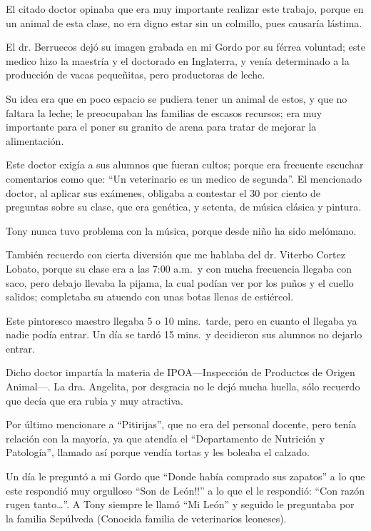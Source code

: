 \documentclass[letterpaper, 12pt]{book}
\begin{document}
El  citado doctor opinaba que era muy importante realizar este trabajo, porque en un animal de esta clase, no era digno estar sin un colmillo, pues causaría lástima.

El dr. Berruecos dejó su imagen grabada en mi Gordo por su férrea voluntad; este medico hizo la maestría y el doctorado en Inglaterra, y venía determinado a la producción de vacas pequeñitas, pero productoras de leche. 

Su idea era que en poco espacio se pudiera tener un animal de estos, y que no faltara la leche; le preocupaban las familias de escasos recursos; era muy importante para el poner su granito de arena para tratar de mejorar la alimentación.

Este doctor exigía a sus alumnos que fueran cultos; porque era frecuente escuchar comentarios como que: ``Un veterinario es un medico de segunda''.
El mencionado doctor, al aplicar sus exámenes, obligaba a contestar el 30 por ciento de preguntas sobre su clase, que era genética, y setenta, de música clásica y pintura.

Tony nunca tuvo problema con la música, porque desde niño ha sido melómano. 

También recuerdo con cierta diversión que me hablaba del dr. Viterbo Cortez Lobato, porque su clase era a las 7:00 a.m.\ y con mucha frecuencia llegaba con saco, pero debajo llevaba la pijama, la cual podían  ver por los puños y el cuello salidos; completaba su atuendo con unas botas llenas de estiércol.

Este pintoresco maestro llegaba 5 o 10 mins.\ tarde, pero en cuanto el llegaba ya nadie podía entrar. Un día se tardó 15 mins.\ y decidieron sus alumnos no dejarlo entrar. 

Dicho doctor impartía la materia de IPOA---Inspección de Productos de Origen Animal---.
La dra. Angelita, por desgracia no le dejó mucha huella, sólo recuerdo que decía que era rubia y muy atractiva. 

Por último mencionare a ``Pitirijas'', que no era del personal docente, pero tenía relación con la mayoría, ya que atendía el ``Departamento de Nutrición y Patología'', llamado así porque vendía tortas y les boleaba el calzado.

Un día le preguntó a mi Gordo que ``Donde había comprado sus zapatos'' a lo que este respondió muy orgulloso ``Son de León!!'' a lo que el le respondió:
``Con razón rugen tanto\ldots''.  A Tony siempre le llamó ``Mi León'' y seguido le preguntaba por la familia Sepúlveda (Conocida familia de veterinarios leoneses).
\end{document}
